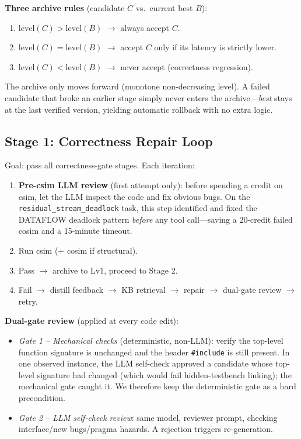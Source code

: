 \documentclass[10pt,conference,letterpaper]{IEEEtran}
\begin{document}
\textbf{Three archive rules} (candidate $C$ vs.\ current best $B$):
\begin{enumerate}
    \item $\text{level}(C) > \text{level}(B)$ $\to$ always accept $C$.
    \item $\text{level}(C) = \text{level}(B)$ $\to$ accept $C$ only if its latency is strictly lower.
    \item $\text{level}(C) < \text{level}(B)$ $\to$ never accept (correctness regression).
\end{enumerate}

The archive only moves forward (monotone non-decreasing level). A failed candidate that broke an earlier stage simply never enters the archive---\emph{best} stays at the last verified version, yielding automatic rollback with no extra logic.

\subsection{Stage 1: Correctness Repair Loop}
\label{sec:correctness}

Goal: pass all correctness-gate stages. Each iteration:

\begin{enumerate}
    \item \textbf{Pre-csim LLM review} (first attempt only): before spending a credit on csim, let the LLM inspect the code and fix obvious bugs. On the \texttt{residual\_stream\_deadlock} task, this step identified and fixed the DATAFLOW deadlock pattern \emph{before} any tool call---saving a 20-credit failed cosim and a 15-minute timeout.
    \item Run csim (+ cosim if structural).
    \item Pass $\to$ archive to Lv1, proceed to Stage 2.
    \item Fail $\to$ distill feedback $\to$ KB retrieval $\to$ repair $\to$ dual-gate review $\to$ retry.
\end{enumerate}

\textbf{Dual-gate review} (applied at every code edit):
\begin{itemize}
    \item \emph{Gate 1 -- Mechanical checks} (deterministic, non-LLM): verify the top-level function signature is unchanged and the header \texttt{\#include} is still present. In one observed instance, the LLM self-check approved a candidate whose top-level signature had changed (which would fail hidden-testbench linking); the mechanical gate caught it. We therefore keep the deterministic gate as a hard precondition.
    \item \emph{Gate 2 -- LLM self-check review}: same model, reviewer prompt, checking interface/new bugs/pragma hazards. A rejection triggers re-generation.
\end{itemize}
\end{document}
